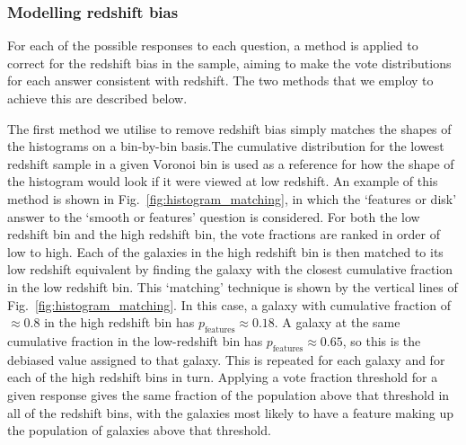 \documentclass[useAMS,usenatbib]{mn2e}
\begin{document}
\subsubsection{Modelling redshift bias}
\label{sec:debiasing}

For each of the possible responses to each question, a method is applied to correct for the redshift bias in the sample, aiming to make the vote distributions for each answer consistent with redshift. The two methods that we employ to achieve this are described below. 

The first method we utilise to remove redshift bias simply matches the shapes of the histograms on a bin-by-bin basis.The cumulative distribution for the lowest redshift sample in a given Voronoi bin is used as a reference for how the shape of the histogram would look if it were viewed at low redshift. An example of this method is shown in Fig.~\ref{fig:histogram_matching}, in which the `features or disk' answer to the `smooth or features' question is considered. For both the low redshift bin and the high redshift bin, the vote fractions are ranked in order of low to high. Each of the galaxies in the high redshift bin is then matched to its low redshift equivalent by finding the galaxy with the closest cumulative fraction in the low redshift bin. This `matching' technique is shown by the vertical lines of Fig.~\ref{fig:histogram_matching}. In this case, a galaxy with cumulative fraction of $\approx 0.8$ in the high redshift bin has $p_{\mathrm{features}} \approx 0.18$. A galaxy at the same cumulative fraction in the low-redshift bin has $p_{\mathrm{features}} \approx 0.65$, so this is the debiased value assigned to that galaxy. This is repeated for each galaxy and for each of the high redshift bins in turn. Applying a vote fraction threshold for a given response gives the same fraction of the population above that threshold in all of the redshift bins, with the galaxies most likely to have a feature making up the population of galaxies above that threshold. 
\end{document}
